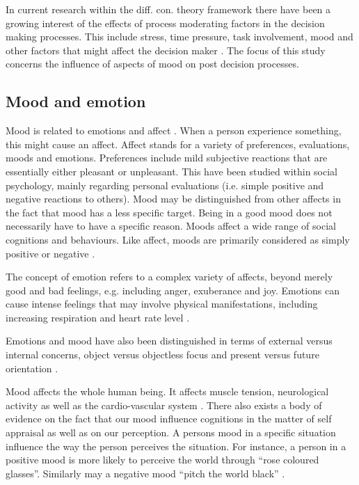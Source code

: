 \documentclass[jou,11pt]{apa6}
\begin{document}
In current research within the diff. con. theory framework there have
been a growing interest of the effects of process moderating factors
in the decision making processes.  This include stress, time pressure,
task involvement, mood and other factors that might affect the
decision maker \parencite{Svensson95}.  The focus of this study concerns the
influence of aspects of mood on post decision processes.


\subsection{Mood and emotion}

Mood is related to emotions and affect \parencite{FiskeTaylor91}. When a
person experience something, this might cause an affect. Affect stands
for a variety of preferences, evaluations, moods and emotions.
Preferences include mild subjective reactions that are essentially
either pleasant or unpleasant.  This have been studied within social
psychology, mainly regarding personal evaluations (i.e.  simple
positive and negative reactions to others).  Mood may be distinguished
from other affects in the fact that mood has a less specific target.
Being in a good mood does not necessarily have to have a specific
reason.  Moods affect a wide range of social cognitions and
behaviours. Like affect, moods are primarily considered as simply
positive or negative \parencite{FiskeTaylor91}.

The concept of emotion refers to a complex variety of affects, beyond
merely good and bad feelings, e.g. including anger, exuberance and
joy.  Emotions can cause intense feelings that may involve physical
manifestations, including increasing respiration and heart rate level
\parencite{FiskeTaylor91}.

Emotions and mood have also been distinguished in terms of external
versus internal concerns, object versus objectless focus and present
versus future orientation \parencite{FiskeTaylor91}.

Mood affects the whole human being.  It affects muscle tension,
neurological activity as well as the cardio-vascular system
\parencite{Izard77}.  There also exists a body of evidence on the fact
that our mood influence cognitions in the matter of self appraisal as
well as on our perception.  A persons mood in a specific situation
influence the way the person perceives the situation.  For instance, a
person in a positive mood is more likely to perceive the world through
``rose coloured glasses''.  Similarly may a negative mood ``pitch the
world black'' \parencite{Izard77}.
\end{document}
